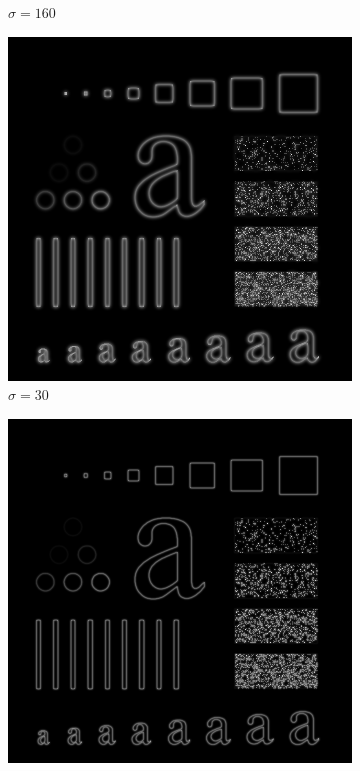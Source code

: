 \documentclass[
	12pt, %
]{style/fphw}
\begin{document}
\begin{figure}[H]
\begin{subfigure}[b]{.3\textwidth}
         \caption{$\sigma=160$}
         \label{Q5_2_highpass_filter_160}
     \end{subfigure}
     \vfill
     \begin{subfigure}[b]{.3\textwidth}
         \centering
         \includegraphics[width=\textwidth]{plots2/Q5_2_highpass_30.png}
         \caption{$\sigma=30$}
         \label{Q5_2_highpass_30}
     \end{subfigure}
     \hfill
     \begin{subfigure}[b]{.3\textwidth}
         \centering
         \includegraphics[width=\textwidth]{plots2/Q5_2_highpass_60.png}

\end{subfigure}
\end{figure}
\end{document}
